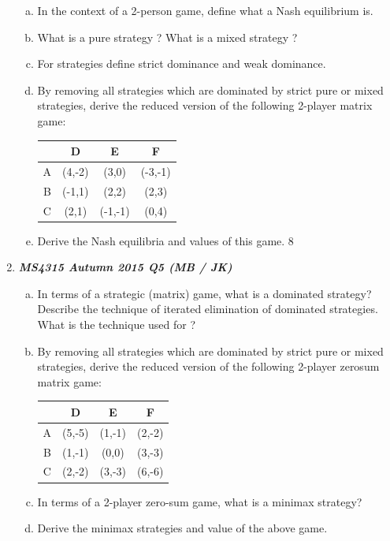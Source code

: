 \documentclass[]{report}
\begin{document}
\begin{enumerate}
\begin{enumerate}[(a)]
	\item In the context of a 2-person game, define what a Nash equilibrium is. 
	\item What is a pure strategy ? What is a mixed strategy ? 
	\item For strategies define strict dominance and weak dominance. 
	\item By removing all strategies which are dominated by strict pure or mixed
	strategies, derive the reduced version of the following 2-player matrix
	game:
	\begin{center}
		\begin{tabular}{|c|c|c|c|} \hline 
			& D & E & F \\ \hline
			A & (4,-2)& (3,0) & (-3,-1) \\ \hline
			B & (-1,1)& (2,2) & (2,3) \\ \hline
			C & (2,1) & (-1,-1) & (0,4) \\ \hline
		\end{tabular}
	\end{center}
	\item  Derive the Nash equilibria and values of this game. 8
\end{enumerate}

\item \textbf{\textit{MS4315 Autumn 2015 Q5  (MB / JK)}}

\begin{enumerate}[(a)]
	\item In terms of a strategic (matrix) game, what is a dominated strategy?
	Describe the technique of iterated elimination of dominated strategies.
	What is the technique used for ? 
	\item By removing all strategies which are dominated by strict pure or mixed
	strategies, derive the reduced version of the following 2-player zerosum
	matrix game:
	\begin{center}
		\begin{tabular}{|c|c|c|c|} \hline 
			& D & E & F \\ \hline
			A & (5,-5)& (1,-1) & (2,-2) \\ \hline
			B & (1,-1)& (0,0) & (3,-3) \\ \hline
			C & (2,-2)& (3,-3)&  (6,-6) \\ \hline
		\end{tabular}
	\end{center}
	\item In terms of a 2-player zero-sum game, what is a minimax strategy? 
	\item Derive the minimax strategies and value of the above game. 
\end{enumerate}


\end{enumerate}
\end{document}
